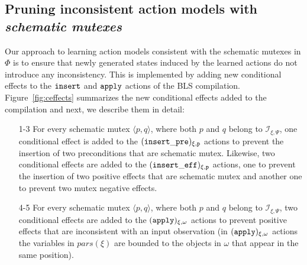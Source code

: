 \documentclass{article}
\newcommand{\tup}[1]{{\langle #1 \rangle}}
\newcommand{\strips}{\textsc{Strips}}
\begin{document}
\subsection{Pruning inconsistent action models with {\em schematic mutexes}}


Our approach to learning action models consistent with the schematic mutexes in $\Phi$ is to ensure that newly generated states induced by the learned actions do not introduce any inconsistency. This is implemented by adding new conditional effects to the ${\tt \small insert}$ and ${\tt\small apply}$ actions of the BLS compilation. Figure~\ref{fig:ceffects} summarizes the new conditional effects added to the compilation and next, we describe them in detail:

\begin{enumerate}
	\item[1-3] For every schematic mutex $\tup{p,q}$, where both $p$ and $q$ belong to ${\mathcal I}_{\xi,\Psi}$, one conditional effect is added to the ${\tt \small (insert\_pre)_{\xi,p}}$ actions to prevent the insertion of two preconditions that are schematic mutex. Likewise, two conditional effects are added to the ${\tt \small (insert\_eff)_{\xi,p}}$ actions, one to prevent the insertion of two positive effects that are schematic mutex and another one to prevent two mutex negative effects.
	\item[4-5] For every schematic mutex $\tup{p,q}$, where both $p$ and $q$ belong to ${\mathcal I}_{\xi,\Psi}$, two conditional effects are added to the ${\tt \small (apply)_{\xi,\omega}}$ actions to prevent positive effects that are inconsistent with an input observation (in ${\tt \small (apply)_{\xi,\omega}}$ actions the variables in $pars(\xi)$ are bounded to the objects in $\omega$ that appear in the same position).
\end{enumerate}
\end{document}
